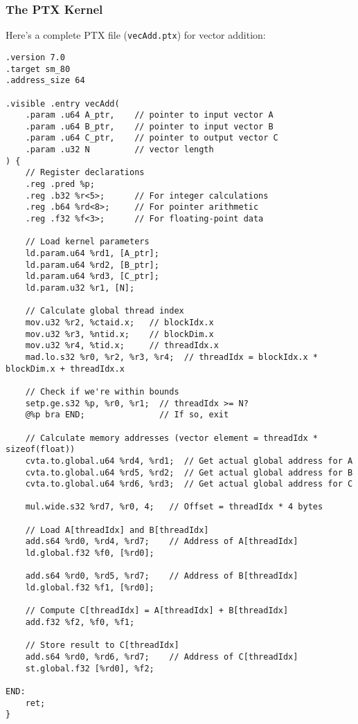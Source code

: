 \subsubsection{The PTX Kernel}

Here's a complete PTX file (\texttt{vecAdd.ptx}) for vector addition:

\begin{lstlisting}[style=ptx]
.version 7.0
.target sm_80
.address_size 64

.visible .entry vecAdd(
    .param .u64 A_ptr,    // pointer to input vector A
    .param .u64 B_ptr,    // pointer to input vector B
    .param .u64 C_ptr,    // pointer to output vector C
    .param .u32 N         // vector length
) {
    // Register declarations
    .reg .pred %p;
    .reg .b32 %r<5>;      // For integer calculations
    .reg .b64 %rd<8>;     // For pointer arithmetic
    .reg .f32 %f<3>;      // For floating-point data
    
    // Load kernel parameters
    ld.param.u64 %rd1, [A_ptr];
    ld.param.u64 %rd2, [B_ptr];
    ld.param.u64 %rd3, [C_ptr];
    ld.param.u32 %r1, [N];
    
    // Calculate global thread index
    mov.u32 %r2, %ctaid.x;   // blockIdx.x
    mov.u32 %r3, %ntid.x;    // blockDim.x
    mov.u32 %r4, %tid.x;     // threadIdx.x
    mad.lo.s32 %r0, %r2, %r3, %r4;  // threadIdx = blockIdx.x * blockDim.x + threadIdx.x
    
    // Check if we're within bounds
    setp.ge.s32 %p, %r0, %r1;  // threadIdx >= N?
    @%p bra END;               // If so, exit
    
    // Calculate memory addresses (vector element = threadIdx * sizeof(float))
    cvta.to.global.u64 %rd4, %rd1;  // Get actual global address for A
    cvta.to.global.u64 %rd5, %rd2;  // Get actual global address for B
    cvta.to.global.u64 %rd6, %rd3;  // Get actual global address for C
    
    mul.wide.s32 %rd7, %r0, 4;   // Offset = threadIdx * 4 bytes
    
    // Load A[threadIdx] and B[threadIdx]
    add.s64 %rd0, %rd4, %rd7;    // Address of A[threadIdx]
    ld.global.f32 %f0, [%rd0];
    
    add.s64 %rd0, %rd5, %rd7;    // Address of B[threadIdx]
    ld.global.f32 %f1, [%rd0];
    
    // Compute C[threadIdx] = A[threadIdx] + B[threadIdx]
    add.f32 %f2, %f0, %f1;
    
    // Store result to C[threadIdx]
    add.s64 %rd0, %rd6, %rd7;    // Address of C[threadIdx]
    st.global.f32 [%rd0], %f2;
    
END:
    ret;
}
\end{lstlisting}

